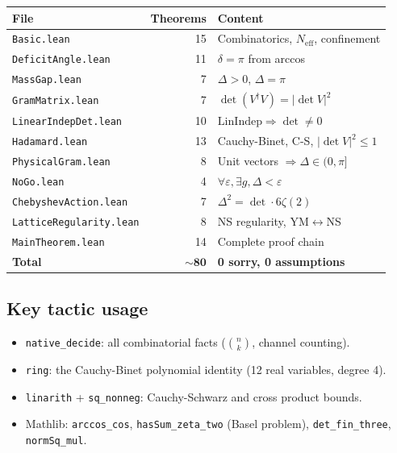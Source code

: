 \documentclass[12pt]{article}
\theoremstyle{definition}
\theoremstyle{remark}
\newcommand{\Neff}{N_{\mathrm{eff}}}
\begin{document}
\begin{center}
\begin{tabular}{lrl}
\toprule
File & Theorems & Content \\
\midrule
\texttt{Basic.lean} & 15
  & Combinatorics, $\Neff$, confinement \\
\texttt{DeficitAngle.lean} & 11
  & $\delta = \pi$ from arccos \\
\texttt{MassGap.lean} & 7
  & $\Delta > 0$, $\Delta = \pi$ \\
\texttt{GramMatrix.lean} & 7
  & $\det(V^\dagger V) = |\det V|^2$ \\
\texttt{LinearIndepDet.lean} & 10
  & $\mathrm{LinIndep} \Rightarrow \det \ne 0$ \\
\texttt{Hadamard.lean} & 13
  & Cauchy-Binet, C-S, $|\det V|^2 \le 1$ \\
\texttt{PhysicalGram.lean} & 8
  & Unit vectors $\Rightarrow \Delta \in (0,\pi]$ \\
\texttt{NoGo.lean} & 4
  & $\forall\varepsilon, \exists g, \Delta < \varepsilon$ \\
\texttt{ChebyshevAction.lean} & 7
  & $\Delta^2 = \det \cdot 6\zeta(2)$ \\
\texttt{LatticeRegularity.lean} & 8
  & NS regularity, YM$\leftrightarrow$NS \\
\texttt{MainTheorem.lean} & 14
  & Complete proof chain \\
\midrule
\textbf{Total} & $\mathbf{\sim\!80}$
  & \textbf{0 sorry, 0 assumptions} \\
\bottomrule
\end{tabular}
\end{center}

\subsection{Key tactic usage}

\begin{itemize}
\item \texttt{native\_decide}: all combinatorial
  facts ($\binom{n}{k}$, channel counting).
\item \texttt{ring}: the Cauchy-Binet polynomial
  identity (12 real variables, degree 4).
\item \texttt{linarith} + \texttt{sq\_nonneg}:
  Cauchy-Schwarz and cross product bounds.
\item Mathlib: \texttt{arccos\_cos},
  \texttt{hasSum\_zeta\_two} (Basel problem),
  \texttt{det\_fin\_three}, \texttt{normSq\_mul}.
\end{itemize}
\end{document}
